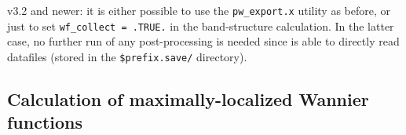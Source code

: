 \begin{enumerate}
      \noindent \QUANTUMESPRESSO{} v3.2 and newer: it is either possible to use the
      {\tt pw\_export.x} utility as before, or just to set 
      {\tt wf\_collect = .TRUE.} in the band-structure calculation. In the latter case, 
      no further run of any post-processing is needed since \WANT{} is able to directly read
      \QUANTUMESPRESSO{} datafiles (stored in the \texttt{\$prefix.save/} directory).

\end{enumerate}


\subsection {Calculation of maximally-localized Wannier
functions}\label{subsection:run_wannier}

